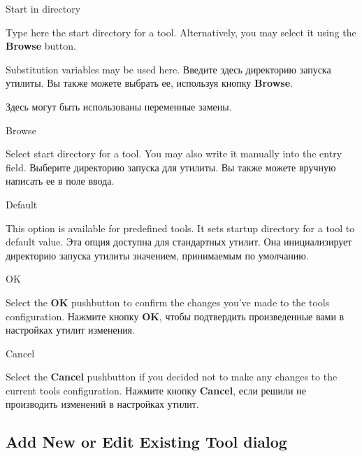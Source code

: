 \begin{popup}
\caption{Start in directory}

\ifenglish
Type here the start directory for a tool. Alternatively, you may select it
using the {\bf Browse} button.

Substitution variables may be used here.
 \else
Введите здесь директорию запуска утилиты. Вы также можете выбрать ее, используя 
кнопку {\bf Browse}.

Здесь могут быть использованы переменные замены.
\fi
\end{popup}

\begin{popup}
\caption{Browse}

\ifenglish
Select start directory for a tool. You may also write it manually into the entry field.
 \else
Выберите директорию запуска для утилиты. Вы также можете вручную написать ее в 
поле ввода. 
\fi
\end{popup}

\begin{popup}
\caption{Default}

\ifenglish
This option is available for predefined tools. It sets startup directory for a tool
to default value.
 \else
Эта опция доступна для стандартных утилит. Она инициализирует директорию запуска
утилиты значением, принимаемым по умолчанию.
\fi
\end{popup}

\begin{popup}
\caption{OK}

\ifenglish
Select the {\bf OK} pushbutton to confirm the changes you've made to the
tools configuration.
 \else
Нажмите кнопку {\bf OK}, чтобы подтвердить произведенные вами в настройках 
утилит изменения.
\fi
\end{popup}

\begin{popup}
\caption{Cancel}

\ifenglish
Select the {\bf Cancel} pushbutton if you decided not to make any changes
to the current tools configuration.
 \else
Нажмите кнопку {\bf Cancel}, если решили не производить изменений в настройках
утилит.
\fi
\end{popup}


\ifenglish
\subsection{Add New or Edit Existing Tool dialog}
 \else
